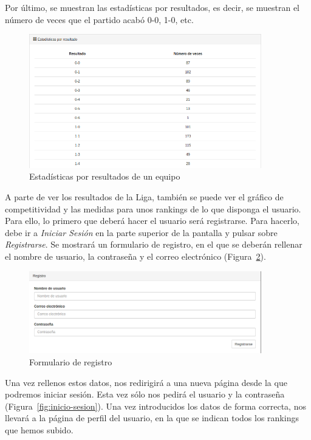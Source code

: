 Por último, se muestran las estadísticas por resultados, es decir, se muestran el número de veces que el partido acabó 0-0, 1-0, etc. \\

\begin{figure}[htb]
\centering
\includegraphics[width=0.9\textwidth]{imagenes/pantallazos-aplicacion/equipo-resultados}
\caption{Estadísticas por resultados de un equipo}
\label{fig:equipo-resultados}
\end{figure}

A parte de ver los resultados de la Liga, también se puede ver el gráfico de competitividad y las medidas para unos rankings de lo que disponga el usuario. Para ello, lo primero que deberá hacer el usuario será registrarse. Para hacerlo, debe ir a \emph{Iniciar Sesión} en la parte superior de la pantalla y pulsar sobre \emph{Registrarse}. Se mostrará un formulario de registro, en el que se deberán rellenar el nombre de usuario, la contraseña y el correo electrónico (Figura~\ref{fig:registro}).\\

\begin{figure}[htb]
\centering
\includegraphics[width=0.9\textwidth]{imagenes/pantallazos-aplicacion/registro}
\caption{Formulario de registro}
\label{fig:registro}
\end{figure}

Una vez rellenos estos datos, nos redirigirá a una nueva página desde la que podremos iniciar sesión. Esta vez sólo nos pedirá el usuario y la contraseña (Figura~\ref{fig:inicio-sesion}). Una vez introducidos los datos de forma correcta, nos llevará a la página de perfil del usuario, en la que se indican todos los rankings que hemos subido.

